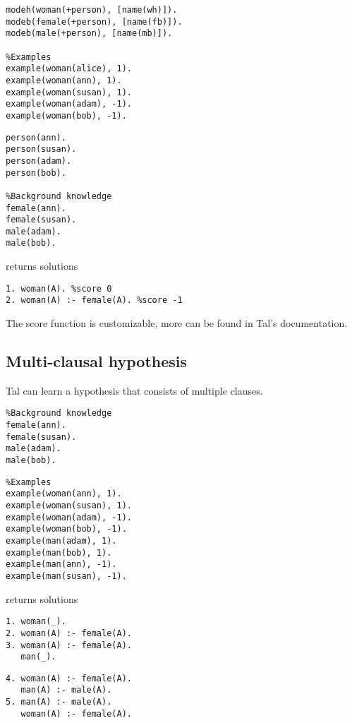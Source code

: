 \begin{minipage}[t]{.50\textwidth}
\begin{lstlisting}
modeh(woman(+person), [name(wh)]).
modeb(female(+person), [name(fb)]).
modeb(male(+person), [name(mb)]).

%Examples
example(woman(alice), 1).
example(woman(ann), 1).
example(woman(susan), 1).
example(woman(adam), -1).
example(woman(bob), -1).
\end{lstlisting}
\end{minipage}
\begin{minipage}[t]{.20\textwidth}
\begin{lstlisting}
person(ann).
person(susan).
person(adam).
person(bob).

%Background knowledge
female(ann).
female(susan).
male(adam).
male(bob).
\end{lstlisting}
\end{minipage}


returns solutions
\begin{lstlisting}
1. woman(A). %score 0
2. woman(A) :- female(A). %score -1
\end{lstlisting}

The score function is customizable, more can be found in Tal's documentation.

\subsection{Multi-clausal hypothesis}
Tal can learn a hypothesis that consists of multiple clauses.

\begin{minipage}[t]{.50\textwidth}
\begin{lstlisting}
%Background knowledge
female(ann).
female(susan).
male(adam).
male(bob). 
\end{lstlisting}
\end{minipage}
\begin{minipage}[t]{.20\textwidth}
\begin{lstlisting}
%Examples
example(woman(ann), 1).
example(woman(susan), 1).
example(woman(adam), -1).
example(woman(bob), -1).
example(man(adam), 1).
example(man(bob), 1).
example(man(ann), -1).
example(man(susan), -1).
\end{lstlisting}
\end{minipage}

returns solutions

\begin{minipage}[t]{.50\textwidth}
\begin{lstlisting}
1. woman(_).
2. woman(A) :- female(A).
3. woman(A) :- female(A).
   man(_).
\end{lstlisting}
\end{minipage}
\begin{minipage}[t]{.20\textwidth}
\begin{lstlisting}
4. woman(A) :- female(A).
   man(A) :- male(A).
5. man(A) :- male(A).
   woman(A) :- female(A).
\end{lstlisting}
\end{minipage}

